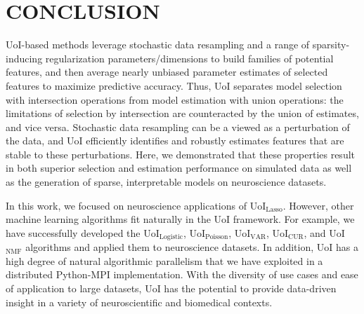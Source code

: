 \documentclass[letterpaper, 10 pt, conference]{ieeeconf}  %
\begin{document}
\section{CONCLUSION}

UoI-based methods leverage stochastic data resampling and a range of sparsity-inducing regularization parameters/dimensions to build families of potential features, and then average nearly unbiased parameter estimates of selected features to maximize predictive accuracy. Thus, UoI separates model selection with intersection operations from model estimation with union operations: the limitations of selection by intersection are counteracted by the union of estimates, and vice versa. Stochastic data resampling can be a viewed as a perturbation of the data, and UoI efficiently identifies and robustly estimates features that are stable to these perturbations. Here, we demonstrated that these properties result in both superior selection and estimation performance on simulated data as well as the generation of sparse, interpretable models on neuroscience datasets.

In this work, we focused on neuroscience applications of UoI$_{\text{Lasso}}$. However, other machine learning algorithms fit naturally in the UoI framework. For example, we have successfully developed  the UoI$_{\text{Logistic}}$, UoI$_{\text{Poisson}}$, UoI$_{\text{VAR}}$, UoI$_{\text{CUR}}$, and UoI$_{\text{NMF}}$ algorithms and applied them to neuroscience datasets. In addition, UoI has a high degree of natural algorithmic parallelism that we have exploited in a distributed Python-MPI implementation. With the diversity of use cases and ease of application to large datasets, UoI has the potential to provide data-driven insight in a variety of neuroscientific and biomedical contexts.

\addtolength{\textheight}{-12cm}   %

\end{document}
